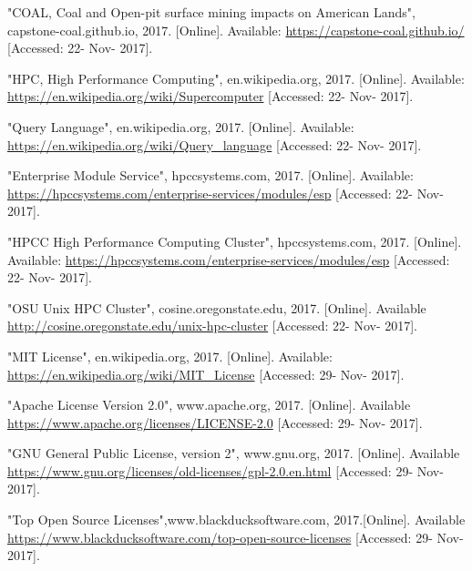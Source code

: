 \documentclass[onecolumn, draftclsnofoot,10pt, compsoc]{IEEEtran}
\begin{document}
\begin{thebibliography}{9}
 "COAL, Coal and Open-pit surface mining impacts on American Lands", capstone-coal.github.io, 2017. [Online]. Available: \url{https://capstone-coal.github.io/} [Accessed: 22- Nov- 2017].

 "HPC, High Performance Computing", en.wikipedia.org, 2017. [Online]. Available: \url{https://en.wikipedia.org/wiki/Supercomputer} [Accessed: 22- Nov- 2017].

 "Query Language", en.wikipedia.org, 2017. [Online]. Available: \url{https://en.wikipedia.org/wiki/Query_language} [Accessed: 22- Nov- 2017].

 "Enterprise Module Service", hpccsystems.com, 2017. [Online]. Available: \url{https://hpccsystems.com/enterprise-services/modules/esp} [Accessed: 22- Nov- 2017].

 "HPCC High Performance Computing Cluster", hpccsystems.com, 2017. [Online]. Available: \url{https://hpccsystems.com/enterprise-services/modules/esp} [Accessed: 22- Nov- 2017].

 "OSU Unix HPC Cluster", cosine.oregonstate.edu, 2017. [Online]. Available \url{http://cosine.oregonstate.edu/unix-hpc-cluster} [Accessed: 22- Nov- 2017].

 "MIT License", en.wikipedia.org, 2017. [Online]. Available: \url{https://en.wikipedia.org/wiki/MIT_License} [Accessed: 29- Nov- 2017].

 "Apache License Version 2.0", www.apache.org, 2017. [Online]. Available \url{https://www.apache.org/licenses/LICENSE-2.0} [Accessed: 29- Nov- 2017].

 "GNU General Public License, version 2", www.gnu.org, 2017. [Online]. Available \url{https://www.gnu.org/licenses/old-licenses/gpl-2.0.en.html} [Accessed: 29- Nov- 2017].

 "Top Open Source Licenses",www.blackducksoftware.com, 2017.[Online]. Available \url{https://www.blackducksoftware.com/top-open-source-licenses} [Accessed: 29- Nov- 2017].
\end{thebibliography}
\end{document}
